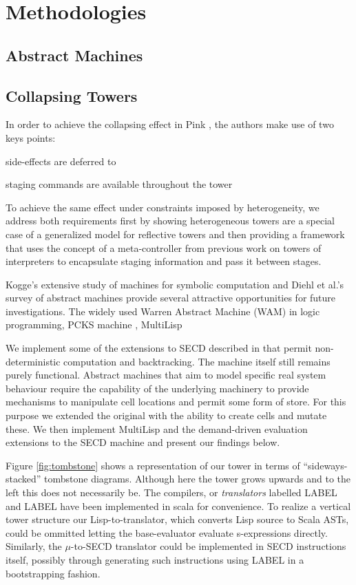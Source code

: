 \documentclass[fleqn]{article}
\theoremstyle{definition}
\begin{document}
\section{Methodologies}
\subsection{Abstract Machines}
\subsection{Collapsing Towers}
In order to achieve the collapsing effect in Pink \cite{amin2017collapsing}, the authors make use of two keys points:
\begin{enumerate*}[label=(\arabic*)]
	\item side-effects are deferred to \mslang
	\item staging commands are available throughout the tower
\end{enumerate*}

To achieve the same effect under constraints imposed by heterogeneity, we address both requirements first by showing heterogeneous towers are a special case of a generalized model for reflective towers and then providing a framework that uses the concept of a meta-controller from previous work on towers of interpreters to encapsulate staging information and pass it between stages.

Kogge's extensive study of machines for symbolic computation \cite{kogge1990architecture} and Diehl et al.'s survey of abstract machines provide several attractive opportunities for future investigations. The widely used Warren Abstract Machine (WAM) in logic programming, PCKS machine \cite{moreau1994pcks}, MultiLisp

We implement some of the extensions to SECD described in \cite{kogge1990architecture} that permit non-deterministic computation and backtracking. The machine itself still remains purely functional. Abstract machines that aim to model specific real system behaviour require the capability of the underlying machinery to provide mechanisms to manipulate cell locations and permit some form of store. For this purpose we extended the original \mslang with the ability to create cells and mutate these. We then implement MultiLisp and the demand-driven evaluation extensions to the SECD machine and present our findings below.

Figure \ref{fig:tombstone} shows a representation of our tower in terms of ``sideways-stacked'' tombstone diagrams. Although here the tower grows upwards and to the left this does not necessarily be. The compilers, or \textit{translators} labelled LABEL and LABEL have been implemented in scala for convenience. To realize a vertical tower structure our Lisp-to-\mslang translator, which converts Lisp source to Scala ASTs, could be ommitted letting the base-evaluator evaluate s-expressions directly. Similarly, the $\mu$-to-SECD translator could be implemented in SECD instructions itself, possibly through generating such instructions using LABEL in a bootstrapping fashion.
\end{document}
